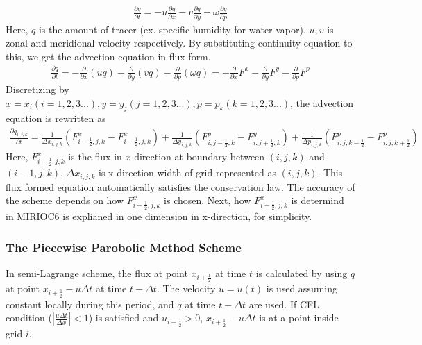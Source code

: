 \begin{eqnarray}\frac{\partial q}{\partial t} = -u \frac{\partial q}{\partial x}-v \frac{\partial q}{\partial y}-\omega \frac{\partial q}{\partial p}\end{eqnarray} Here, \(q\) is the amount of tracer (ex. specific humidity for
water vapor), \(u,v\) is zonal and meridional velocity respectively. By substituting continuity equation to this, we get the advection equation in flux form.
\begin{eqnarray}\frac{\partial q}{\partial t}=-\frac{\partial}{\partial x}(uq)-\frac{\partial}{\partial y}(vq)-\frac{\partial}{\partial p}(\omega q)
  =-\frac{\partial}{\partial x}F^{x}-\frac{\partial}{\partial y}F^{y}-\frac{\partial}{\partial p}F^{p}\end{eqnarray} Discretizing by \(x=x_{i} (i=1,2,3...), y=y_{j} (j=1,2,3...), p=p_{k} (k=1,2,3...)\), the
advection equation is rewritten as
\begin{eqnarray}\frac{\partial q_{i,j,k}}{\partial t}=\frac{1}{\Delta x_{i,j,k}}(F^{x}_{i-\frac{1}{2},j,k}-F^{x}_{i+\frac{1}{2},j,k})+\frac{1}{\Delta y_{i,j,k}}(F^{y}_{i,j-\frac{1}{2},k}-F^{y}_{i,j+\frac{1}{2},k})+\frac{1}{\Delta p_{i,j,k}}(F^{p}_{i,j,k-\frac{1}{2}}-F^{p}_{i,j,k+\frac{1}{2}})\end{eqnarray}
Here, \(F^{x}_{i-\frac{1}{2},j,k}\) is the flux in \(x\) direction at boundary between \((i,j,k)\) and \((i-1,j,k)\), \(\Delta x_{i,j,k}\) is x-direction width of grid represented as \((i,j,k)\). This
flux formed equation automatically satisfies the conservation law. The accuracy of the scheme depends on how \(F^{x}_{i-\frac{1}{2},j,k}\) is chosen. Next, how \(F^{x}_{i-\frac{1}{2},j,k}\) is
determind in MIRIOC6 is explianed in one dimension in x-direction, for simplicity.

\hypertarget{the-piecewise-parobolic-method-scheme}{%
\subsubsection{The Piecewise Parobolic Method Scheme}\label{the-piecewise-parobolic-method-scheme}}

In semi-Lagrange scheme, the flux at point \(x_{i+\frac{1}{2}}\) at time \(t\) is calculated by using \(q\) at point \(x_{i+\frac{1}{2}}-u\Delta t\) at time \(t-\Delta t\). The velocity \(u=u(t)\) is
used assuming constant locally during this period, and \(q\) at time \(t-\Delta t\) are used. If CFL condition (\(|\frac{u\Delta t}{\Delta x}|<1\)) is satisfied and \(u_{i+\frac{1}{2}}>0\),
\(x_{i+\frac{1}{2}}-u\Delta t\) is at a point inside grid \(i\).

